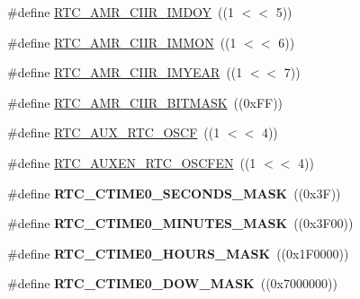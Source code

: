 \begin{DoxyCompactItemize}
\item 
\#define \hyperlink{group___r_t_c__17_x_x__40_x_x_gaec7d51e7a503514c1d71bf9428c6f3e8}{R\+T\+C\+\_\+\+A\+M\+R\+\_\+\+C\+I\+I\+R\+\_\+\+I\+M\+D\+O\+Y}~((1 $<$$<$ 5))
\item 
\#define \hyperlink{group___r_t_c__17_x_x__40_x_x_ga841dfecc952d8b6d275e799cb9e89c02}{R\+T\+C\+\_\+\+A\+M\+R\+\_\+\+C\+I\+I\+R\+\_\+\+I\+M\+M\+O\+N}~((1 $<$$<$ 6))
\item 
\#define \hyperlink{group___r_t_c__17_x_x__40_x_x_ga56b312d9e291685d843f6dae171f4441}{R\+T\+C\+\_\+\+A\+M\+R\+\_\+\+C\+I\+I\+R\+\_\+\+I\+M\+Y\+E\+A\+R}~((1 $<$$<$ 7))
\item 
\#define \hyperlink{group___r_t_c__17_x_x__40_x_x_gafcc754fba01521c5aa4f1775b889e894}{R\+T\+C\+\_\+\+A\+M\+R\+\_\+\+C\+I\+I\+R\+\_\+\+B\+I\+T\+M\+A\+S\+K}~((0x\+F\+F))
\item 
\#define \hyperlink{group___r_t_c__17_x_x__40_x_x_gaafb1215dfd0f9bbe198274689a1f1584}{R\+T\+C\+\_\+\+A\+U\+X\+\_\+\+R\+T\+C\+\_\+\+O\+S\+C\+F}~((1 $<$$<$ 4))
\item 
\#define \hyperlink{group___r_t_c__17_x_x__40_x_x_ga12b8af6f1d4757d19c1b09d85d3fc497}{R\+T\+C\+\_\+\+A\+U\+X\+E\+N\+\_\+\+R\+T\+C\+\_\+\+O\+S\+C\+F\+E\+N}~((1 $<$$<$ 4))
\item 
\hypertarget{group___r_t_c__17_x_x__40_x_x_ga913865a5d046fddddcae67fb05210d87}{\#define {\bfseries R\+T\+C\+\_\+\+C\+T\+I\+M\+E0\+\_\+\+S\+E\+C\+O\+N\+D\+S\+\_\+\+M\+A\+S\+K}~((0x3\+F))}\label{group___r_t_c__17_x_x__40_x_x_ga913865a5d046fddddcae67fb05210d87}

\item 
\hypertarget{group___r_t_c__17_x_x__40_x_x_ga3b8e88e913a22b08a7b814763e4c8452}{\#define {\bfseries R\+T\+C\+\_\+\+C\+T\+I\+M\+E0\+\_\+\+M\+I\+N\+U\+T\+E\+S\+\_\+\+M\+A\+S\+K}~((0x3\+F00))}\label{group___r_t_c__17_x_x__40_x_x_ga3b8e88e913a22b08a7b814763e4c8452}

\item 
\hypertarget{group___r_t_c__17_x_x__40_x_x_ga1778d80de2c97e680394bdd8770b9119}{\#define {\bfseries R\+T\+C\+\_\+\+C\+T\+I\+M\+E0\+\_\+\+H\+O\+U\+R\+S\+\_\+\+M\+A\+S\+K}~((0x1\+F0000))}\label{group___r_t_c__17_x_x__40_x_x_ga1778d80de2c97e680394bdd8770b9119}

\item 
\hypertarget{group___r_t_c__17_x_x__40_x_x_gaee63196753f1c3ce9621a780c2fae3c9}{\#define {\bfseries R\+T\+C\+\_\+\+C\+T\+I\+M\+E0\+\_\+\+D\+O\+W\+\_\+\+M\+A\+S\+K}~((0x7000000))}\label{group___r_t_c__17_x_x__40_x_x_gaee63196753f1c3ce9621a780c2fae3c9}


\end{DoxyCompactItemize}
